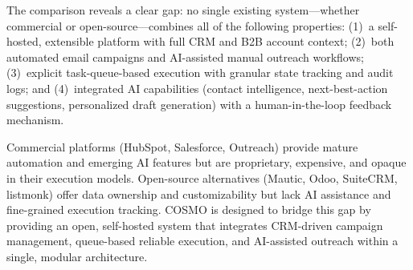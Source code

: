 The comparison reveals a clear gap: no single existing system---whether commercial or open-source---combines all of the following properties: (1)~a self-hosted, extensible platform with full CRM and B2B account context; (2)~both automated email campaigns and AI-assisted manual outreach workflows; (3)~explicit task-queue-based execution with granular state tracking and audit logs; and (4)~integrated AI capabilities (contact intelligence, next-best-action suggestions, personalized draft generation) with a human-in-the-loop feedback mechanism.

Commercial platforms (HubSpot, Salesforce, Outreach) provide mature automation and emerging AI features but are proprietary, expensive, and opaque in their execution models. Open-source alternatives (Mautic, Odoo, SuiteCRM, listmonk) offer data ownership and customizability but lack AI assistance and fine-grained execution tracking. COSMO is designed to bridge this gap by providing an open, self-hosted system that integrates CRM-driven campaign management, queue-based reliable execution, and AI-assisted outreach within a single, modular architecture.
